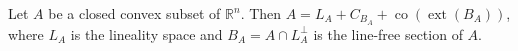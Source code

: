 Let $A$ be a closed convex subset of $\mathbb{R}^n$. Then $A = L_A + C_{B_A} + \operatorname{co}(\operatorname{ext}(B_A))$, where $L_A$ is the lineality space and $B_A = A \cap L_A^\perp$ is the line-free section of $A$.